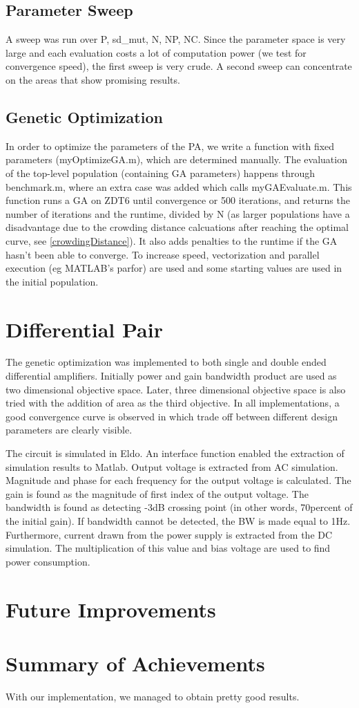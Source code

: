 \subsection{Parameter Sweep}
A sweep was run over P, sd_mut, N, NP, NC. Since the parameter space is very large and each evaluation costs a lot of computation power (we test for convergence speed), the first sweep is very crude.
A second sweep can concentrate on the areas that show promising results.

\subsection{Genetic Optimization} 
In order to optimize the parameters of the PA, we write a function with fixed parameters (myOptimizeGA.m), which are determined manually.
The evaluation of the top-level population (containing GA parameters) happens through benchmark.m, where an extra case was added which calls myGAEvaluate.m.
This function runs a GA on ZDT6 until convergence or 500 iterations, and returns the number of iterations and the runtime, divided by N (as larger populations have a disadvantage due to the crowding distance calcuations after reaching the optimal curve, see \ref{crowdingDistance}). It also adds penalties to the runtime if the GA hasn't been able to converge.
To increase speed, vectorization and parallel execution (eg MATLAB's parfor) are used and some starting values are used in the initial population. \\

\section{Differential Pair} 

The genetic optimization was implemented to both single and double ended differential amplifiers. Initially power and gain bandwidth product are used as two dimensional objective space. Later, three dimensional objective space is also tried with the addition of area as the third objective. In all implementations, a good convergence curve is observed in which trade off between different design parameters are clearly visible. 

The circuit is simulated in Eldo. An interface function enabled the extraction of simulation results to Matlab. Output voltage is extracted from AC simulation. Magnitude and phase for each frequency for the output voltage is calculated. The gain is found as the magnitude of first index of the output voltage. The bandwidth is found as detecting -3dB crossing point (in other words, 70percent of the initial gain). If bandwidth cannot be detected, the BW is made equal to 1Hz. Furthermore, current drawn from the power supply is extracted from the DC simulation. The multiplication of this value and bias voltage are used to find power consumption.


\section{Future Improvements}
\section{Summary of  Achievements}\label{summary}

With our implementation, we managed to obtain pretty good results. 
